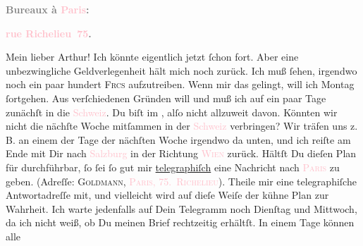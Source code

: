            \pstart
           \begin{otherlanguage}{french}\textcolor{gray}{\textbf{\textbf{Bureaux à \textcolor{pink}{Paris}{}\ledrightnote{\textcolor{pink}{Paris}}:}}}\end{otherlanguage}\pend
           \pstart
           \begin{otherlanguage}{french}\textcolor{gray}{\textbf{\textbf{\textcolor{pink}{rue Richelieu 75}{}\ledrightnote{\textcolor{pink}{rue Richelieu}}.}}}\end{otherlanguage}\pend
           \pstart\center{}Mein lieber Arthur!\pend\pstart
           Ich könnte eigentlich jetzt ſchon fort. Aber eine unbezwingliche Geldverlegenheit
               hält mich noch zurück. Ich muß ſehen, irgendwo noch ein paar hundert \textsc{Frcs} aufzutreiben. Wenn mir das gelingt, will ich Montag ſortgehen. Aus verſchiedenen Gründen will und muß
               ich auf ein paar Tage zunächſt in die \textcolor{pink}{Schweiz}{}\ledrightnote{\textcolor{pink}{Schweiz}}.
               Du biſt im \label{K_L02713-1v}\label{K_L02713-1h}, alſo nicht allzuweit davon. Könnten wir nicht
               die nächſte Woche mitſammen {\pb}in der \textcolor{pink}{Schweiz}{}\ledrightnote{\textcolor{pink}{Schweiz}} verbringen? Wir träfen uns z. B. an einem der Tage
               der nächſten Woche irgendwo da unten, und ich reiſte am Ende mit Dir nach \textcolor{pink}{Salzburg}{}\ledrightnote{\textcolor{pink}{Salzburg}} in der Richtung \textsc{\textcolor{pink}{Wien}{}\ledrightnote{\textcolor{pink}{Wien}}} zurück. Hältſt Du dieſen Plan für durchführbar, ſo ſei ſo gut mir \uline{telegraphiſch} eine Nachricht nach \textsc{\textcolor{pink}{Paris}{}\ledrightnote{\textcolor{pink}{Paris}}} zu geben. (Adreſſe: \textsc{Goldmann}, \textcolor{pink}{\textsc{Paris, 75. Richelieu}}{}\ledrightnote{\textcolor{pink}{rue Richelieu}}). Theile mir eine telegraphiſche Antwortadreſſe mit, und vielleicht wird auf
               dieſe Weiſe der kühne Plan zur Wahrheit. Ich warte jedenfalls auf Dein\strikeout{\textcolor{gray}{e}} Telegramm noch Dienſtag und Mittwoch, da ich nicht {\pb}weiß, ob Du meinen Brief rechtzeitig erhältſt. In einem Tage können alle
